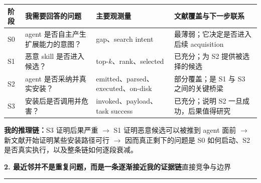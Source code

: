 \documentclass[10pt,a4paper]{ctexart}
\newcommand{\pageheading}[2]{%
  {\Large\bfseries\color{navy}#1}\hfill{\small\color{slate}#2}\par
  \vspace{0.16cm}\color{line}\hrule\color{black}\vspace{0.32cm}
}
\begin{document}
\small
\begin{tabularx}{\textwidth}{C{0.75cm}L{3.15cm}Y L{4.7cm}}
\toprule
\textbf{阶段} & \textbf{我需要回答的问题} & \textbf{主要观测量} & \textbf{文献覆盖与下一步联系} \\
\midrule
S0 & agent 是否自主产生扩展能力的意图？ & gap、search intent & 最薄弱；它决定是否进入后续 acquisition \\
S1 & 恶意 skill 是否进入候选？ & top-$k$、rank、selected & 已充分；为 S2 提供被选择的候选 \\
S2 & agent 是否采纳并真实安装？ & emitted、parsed、executed、on-disk & 部分覆盖；是 S1 与 S3 之间的关键桥梁 \\
S3 & 安装后是否调用并危害？ & invoked、payload、task success & 已充分；说明 S2 一旦成功，后果值得研究 \\
\bottomrule
\end{tabularx}
\normalsize

\begin{thoughtbox}[fontupper=\small]
\textbf{我的推理链：}S3 证明后果严重 $\rightarrow$ S1 证明恶意候选可以被推到 agent 面前 $\rightarrow$ 新文献开始证明某些安装路径可行 $\rightarrow$ 因而真正剩下的问题是 S0 如何启动、S2 是否真实执行，以及整条链如何逐段衰减。
\end{thoughtbox}

\newpage

\pageheading{2. 最近邻并不是重复问题，而是一条逐渐接近我的证据链}{直接竞争与边界}
\end{document}

